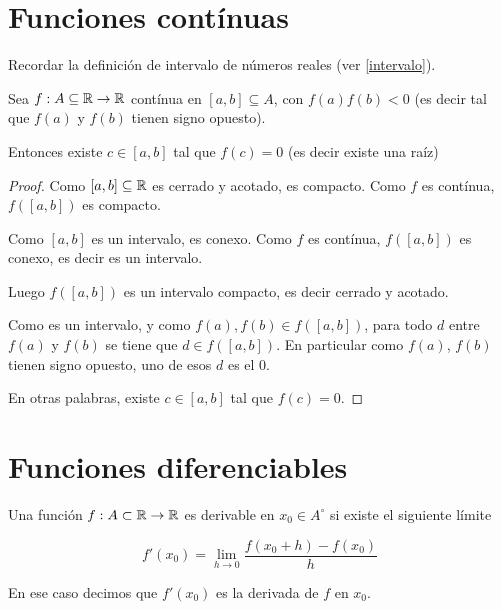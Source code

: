 \chapter{Funciones contínuas}

Recordar la definición de intervalo de números reales (ver \ref{intervalo}).


\begin{theorem}[Bolzano]
Sea $f : A \subseteq \mathbb{R} \to \mathbb{R}$ contínua en $[a,b] \subseteq A$, con $f(a) f(b) < 0$ (es decir tal que $f(a)$ y $f(b)$ tienen signo opuesto).

Entonces existe $c \in [a,b]$ tal que $f(c) = 0$ (es decir existe una raíz)
\end{theorem}

\begin{proof}
Como $[a,b] \subseteq \mathbb{R}$ es cerrado y acotado, es compacto.  Como $f$ es contínua, $f([a,b])$ es compacto.

Como $[a,b]$ es un intervalo, es conexo.  Como $f$ es contínua, $f([a,b])$ es conexo, es decir es un intervalo.

Luego $f([a,b])$ es un intervalo compacto, es decir cerrado y acotado.

Como es un intervalo, y como $f(a), f(b) \in f([a,b])$, para todo $d$ entre $f(a)$ y $f(b)$ se tiene que $d \in f([a,b])$.  En particular como $f(a)$, $f(b)$ tienen signo opuesto, uno de esos $d$ es el $0$.

En otras palabras, existe $c \in [a,b]$ tal que $f(c) = 0$. 
\end{proof}



\chapter{Funciones diferenciables}

\begin{definition}[Derivada] \label{derivada}
Una función $f : A \subset \mathbb{R} \to \mathbb{R}$ es derivable en $x_0 \in A^{\circ}$ si existe el siguiente límite

$$ f'(x_0) = \lim_{h \to 0} \frac{f(x_0 + h) - f(x_0)}{h} $$

En ese caso decimos que $f'(x_0)$ es la derivada de $f$ en $x_0$.
\end{definition}

